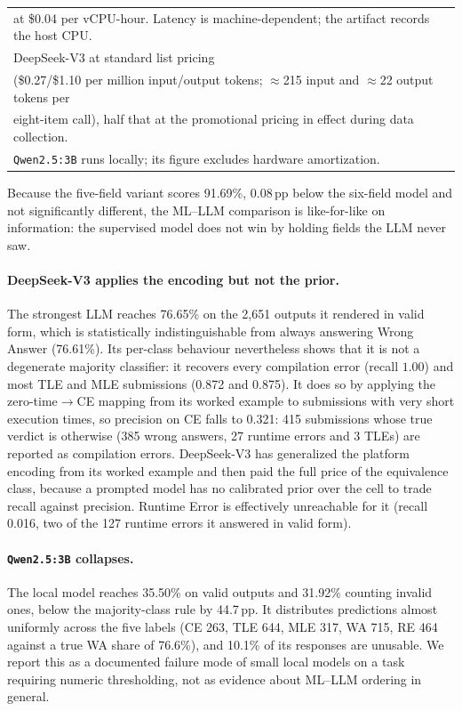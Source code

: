 \documentclass[acmsmall]{acmart}
\begin{document}
\begin{table}[htbp]
{\begin{tabular}{@{}lcccc@{}}
\multicolumn{5}{l}{\small at \$0.04 per vCPU-hour. Latency is machine-dependent; the artifact records the host CPU.}\\
\multicolumn{5}{l}{\small DeepSeek-V3 at standard list pricing}\\
\multicolumn{5}{l}{\small (\$0.27/\$1.10 per million input/output tokens; $\approx$215 input and $\approx$22 output tokens per}\\
\multicolumn{5}{l}{\small eight-item call), half that at the promotional pricing in effect during data collection.}\\
\multicolumn{5}{l}{\small \texttt{Qwen2.5:3B} runs locally; its figure excludes hardware amortization.}\\
\bottomrule
\end{tabular}%
}
\end{table}

Because the five-field variant scores 91.69\%, 0.08\,pp below the six-field
model and not significantly different, the ML--LLM comparison is like-for-like
on information: the supervised model does not win by holding fields the LLM
never saw.

\paragraph{DeepSeek-V3 applies the encoding but not the prior.} The strongest
LLM reaches 76.65\% on the 2{,}651 outputs it rendered in valid form, which is
statistically indistinguishable from always answering Wrong Answer (76.61\%).
Its per-class behaviour nevertheless shows that it is not a degenerate majority
classifier: it recovers every compilation error (recall $1.00$) and most TLE
and MLE submissions (0.872 and 0.875). It does so by applying the
zero-time$\rightarrow$CE mapping from its worked example to submissions with
very short execution times, so precision on CE falls to 0.321: 415 submissions
whose true verdict is otherwise (385 wrong answers, 27 runtime errors and 3
TLEs) are reported as compilation errors. DeepSeek-V3 has generalized the platform
encoding from its worked example and then paid the full price
of the equivalence class, because a prompted model has no calibrated prior over
the cell to trade recall against precision. Runtime Error is effectively
unreachable for it (recall 0.016, two of the 127 runtime errors it answered in
valid form).

\paragraph{\texttt{Qwen2.5:3B} collapses.} The local model reaches 35.50\% on
valid outputs and 31.92\% counting invalid ones, below the majority-class rule
by 44.7\,pp. It distributes predictions almost uniformly across the five
labels (CE 263, TLE 644, MLE 317, WA 715, RE 464 against a true WA share of
76.6\%), and 10.1\% of its responses are unusable. We report this as a
documented failure mode of small local models on a task requiring numeric
thresholding, not as evidence about ML--LLM ordering in general.
\end{document}
